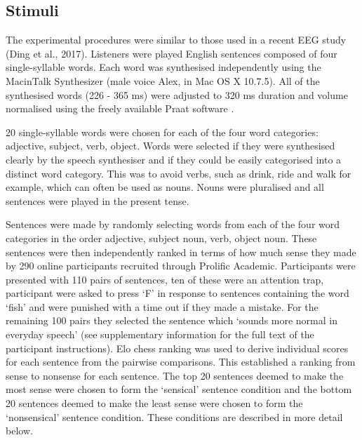 \documentclass[10pt,letterpaper]{article}
\begin{document}
\subsection*{Stimuli}

The experimental procedures were similar to those used in a recent EEG
study (Ding et al., 2017). Listeners were played English sentences
composed of four single-syllable words. Each word was synthesised
independently using the MacinTalk Synthesizer (male voice Alex, in Mac
OS X 10.7.5). All of the synthesised words (226 - 365 ms) were
adjusted to 320 ms duration and volume normalised using the freely
available Praat software \cite{BoersmaWeenink2018}.

20 single-syllable words were chosen for each of the four word
categories: adjective, subject, verb, object. Words were selected if
they were synthesised clearly by the speech synthesiser and if they
could be easily categorised into a distinct word category.  This was
to avoid verbs, such as drink, ride and walk for example, which can
often be used as nouns. Nouns were pluralised and all sentences were
played in the present tense.


Sentences were made by randomly selecting words from each of the four
word categories in the order adjective, subject noun, verb, object
noun. These sentences were then independently ranked in terms of how
much sense they made by 290 online participants recruited through
Prolific Academic. Participants were presented with 110 pairs of
sentences, ten of these were an attention trap, participant were asked
to press \lq{F}\rq{} in response to sentences containing the word
\lq{}fish\rq{} and were punished with a time out if they made a
mistake. For the remaining 100 pairs they selected the sentence which
\lq{}sounds more normal in everyday speech\rq{} (see supplementary
information for the full text of the participant instructions). Elo
chess ranking \cite{Elo1978} was used to derive individual scores for
each sentence from the pairwise comparisons. This established a
ranking from sense to nonsense for each sentence. The top 20 sentences
deemed to make the most sense were chosen to form the
\lq{}sensical\rq{} sentence condition and the bottom 20 sentences
deemed to make the least sense were chosen to form the \lq{}nonsensical\rq{}
sentence condition. These conditions are described in more detail
below.

\end{document}
